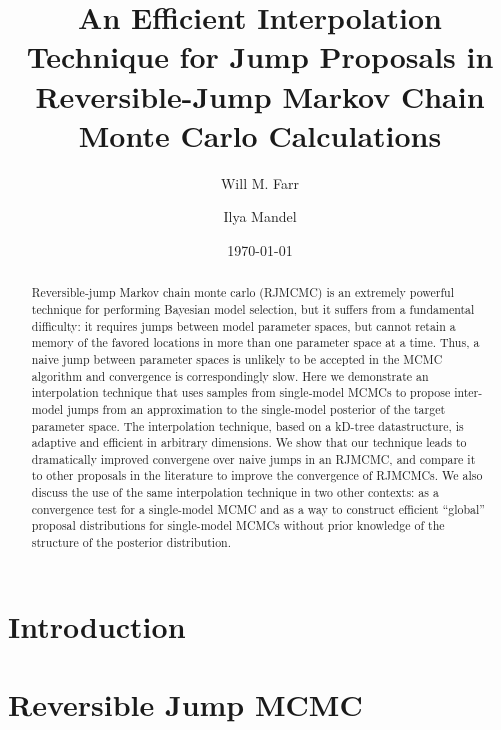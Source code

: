 \documentclass[prd,preprint]{revtex4}
\begin{document}
\title{An Efficient Interpolation Technique for Jump Proposals in
  Reversible-Jump Markov Chain Monte Carlo Calculations}

\date{\today}

\author{Will M. Farr}


\author{Ilya Mandel}


\begin{abstract}
  Reversible-jump Markov chain monte carlo (RJMCMC) is an extremely
  powerful technique for performing Bayesian model selection, but it
  suffers from a fundamental difficulty: it requires jumps between
  model parameter spaces, but cannot retain a memory of the favored
  locations in more than one parameter space at a time.  Thus, a naive
  jump between parameter spaces is unlikely to be accepted in the MCMC
  algorithm and convergence is correspondingly slow.  Here we
  demonstrate an interpolation technique that uses samples from
  single-model MCMCs to propose inter-model jumps from an
  approximation to the single-model posterior of the target parameter
  space.  The interpolation technique, based on a kD-tree
  datastructure, is adaptive and efficient in arbitrary dimensions.
  We show that our technique leads to dramatically improved convergene
  over naive jumps in an RJMCMC, and compare it to other proposals in
  the literature to improve the convergence of RJMCMCs.  We also
  discuss the use of the same interpolation technique in two other
  contexts: as a convergence test for a single-model MCMC and as a way
  to construct efficient ``global'' proposal distributions for
  single-model MCMCs without prior knowledge of the structure of the
  posterior distribution.
\end{abstract}

\maketitle

\section{Introduction}

\section{Reversible Jump MCMC}
\end{document}
